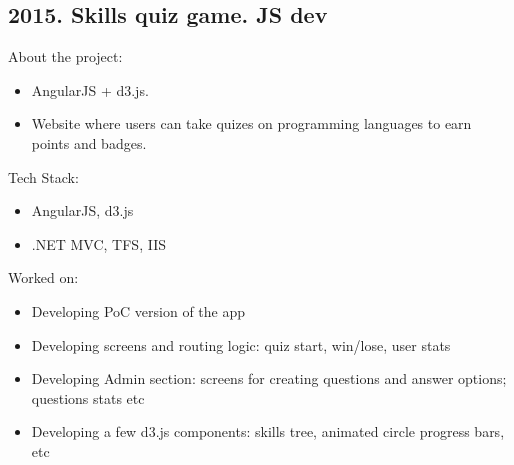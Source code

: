 \documentclass[a4paper, 14pt]{article}
\begin{document}
  \subsection{2015. Skills quiz game. JS dev}
    About the project:
    \begin{itemize}
      \item AngularJS + d3.js. \\
      \item Website where users can take quizes on programming languages to earn points and badges. \\
    \end{itemize}
    Tech Stack:
    \begin{itemize}
      \item AngularJS, d3.js \\
      \item .NET MVC, TFS, IIS \\
    \end{itemize}
    Worked on: 
    \begin{itemize}
      \item Developing PoC version of the app \\
      \item Developing screens and routing logic: quiz start, win/lose, user stats \\
      \item Developing Admin section: screens for creating questions and answer options; questions stats etc \\
      \item Developing a few d3.js components: skills tree, animated circle progress bars, etc \\
    \end{itemize}
\end{document}
